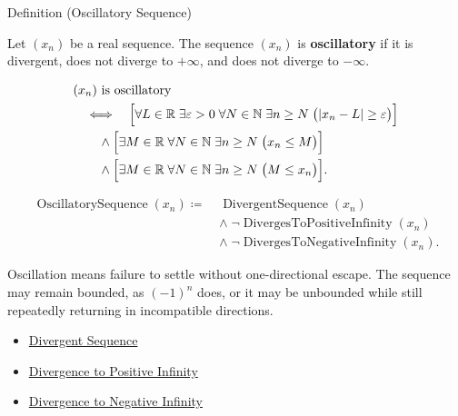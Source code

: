 
\begin{definitionbox}{Definition (Oscillatory Sequence)}
\begin{definition}
\label{def:oscillatory-sequence}
Let $(x_n)$ be a real sequence. The sequence $(x_n)$ is
\textbf{oscillatory} if it is divergent, does not diverge to $+\infty$,
and does not diverge to $-\infty$.
\end{definition}
\end{definitionbox}

\begin{remark*}
\[
\begin{aligned}
&(x_n)\text{ is oscillatory}\\
&\quad\Longleftrightarrow\quad
\Bigl[
  \forall L\in\mathbb{R}\;\exists \varepsilon>0\;\forall N\in\mathbb{N}
  \;\exists n\ge N\;\bigl(|x_n-L|\ge\varepsilon\bigr)
\Bigr]\\
&\qquad\land
\Bigl[
  \exists M\in\mathbb{R}\;\forall N\in\mathbb{N}\;\exists n\ge N
  \;\bigl(x_n\le M\bigr)
\Bigr]\\
&\qquad\land
\Bigl[
  \exists M\in\mathbb{R}\;\forall N\in\mathbb{N}\;\exists n\ge N
  \;\bigl(M\le x_n\bigr)
\Bigr].
\end{aligned}
\]
\end{remark*}

\begin{remark*}
\[
\begin{aligned}
\operatorname{OscillatorySequence}(x_n)
\coloneqq\;&
\operatorname{DivergentSequence}(x_n)\\
&\land\;\neg\operatorname{DivergesToPositiveInfinity}(x_n)\\
&\land\;\neg\operatorname{DivergesToNegativeInfinity}(x_n).
\end{aligned}
\]
\end{remark*}

\begin{remark*}[Interpretation]
Oscillation means failure to settle without one-directional escape. The
sequence may remain bounded, as $(-1)^n$ does, or it may be unbounded while
still repeatedly returning in incompatible directions.
\end{remark*}

\begin{dependencies}
\begin{itemize}
  \item \hyperref[def:divergent-sequence]{Divergent Sequence}
  \item \hyperref[def:diverges-to-positive-infinity]{Divergence to Positive Infinity}
  \item \hyperref[def:diverges-to-negative-infinity]{Divergence to Negative Infinity}
\end{itemize}
\end{dependencies}

